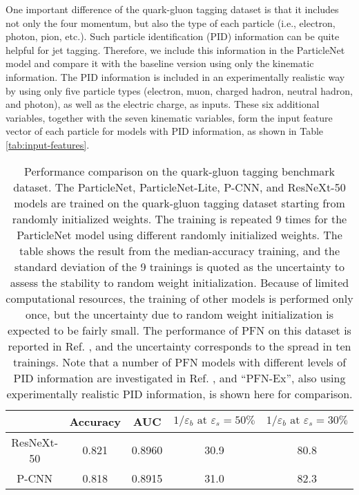 \documentclass[aps,prd,longbibliography,reprint,amsmath,amssymb,amsfonts]{revtex4-1}
\begin{document}
One important difference of the quark-gluon tagging dataset is that it includes not only the four momentum, but also the type of each particle (i.e., electron, photon, pion, etc.). Such particle identification (PID) information can be quite helpful for jet tagging. Therefore, we include this information in the ParticleNet model and compare it with the baseline version using only the kinematic information. The PID information is included in an experimentally realistic way by using only five particle types (electron, muon, charged hadron, neutral hadron, and photon), as well as the electric charge, as inputs. These six additional variables, together with the seven kinematic variables, form the input feature vector of each particle for models with PID information, as shown in Table \ref{tab:input-features}.

\begin{table*}[htbp]
\centering
\caption{Performance comparison on the quark-gluon tagging benchmark dataset. The ParticleNet, ParticleNet-Lite, P-CNN, and ResNeXt-50 models are trained on the quark-gluon tagging dataset starting from randomly initialized weights. The training is repeated 9 times for the ParticleNet model using different randomly initialized weights. The table shows the result from the median-accuracy training, and the standard deviation of the 9 trainings is quoted as the uncertainty to assess the stability to random weight initialization. Because of limited computational resources, the training of other models is performed only once, but the uncertainty due to random weight initialization is expected to be fairly small. The performance of PFN on this dataset is reported in Ref. \cite{Komiske:2018cqr}, and the uncertainty corresponds to the spread in ten trainings. Note that a number of PFN models with different levels of PID information are investigated in Ref. \cite{Komiske:2018cqr}, and ``PFN-Ex'', also using experimentally realistic PID information, is shown here for comparison.}
\label{tab:results-qg}
\begin{ruledtabular}
\begin{tabular}{ccccc}
                & Accuracy & AUC & $1/\varepsilon_{b}\text{ at }\varepsilon_{s}=50\%$ & $1/\varepsilon_{b}\text{ at }\varepsilon_{s}=30\%$ \\
    \hline
    ResNeXt-50           & 0.821     & 0.8960            &  30.9              & 80.8       \\
    P-CNN                & 0.818     & 0.8915            &  31.0              & 82.3       \\

\end{tabular}
\end{ruledtabular}
\end{table*}
\end{document}
